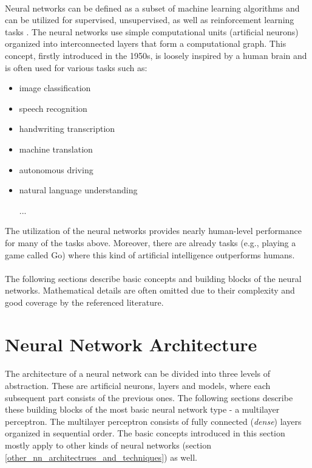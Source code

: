\paragraph{}
Neural networks can be defined as a subset of machine learning algorithms and can be utilized for supervised, unsupervised, as well as reinforcement learning tasks \cite{ml_foundations}. The neural networks use simple computational units (artificial neurons) organized into interconnected layers that form a computational graph. This concept, firstly introduced in the 1950s, is loosely inspired by a human brain \cite{path_mind_NN} and is often used for various tasks \cite{deep_learning_with_python} such as:

\begin{itemize}
	\item image classification
	\item speech recognition
	\item handwriting transcription
	\item machine translation
	\item autonomous driving
	\item natural language understanding
	\item[...]
\end{itemize}

The utilization of the neural networks provides nearly human-level performance for many of the tasks above. Moreover, there are already tasks (e.g., playing a game called Go) where this kind of artificial intelligence outperforms humans.

\paragraph{}
The following sections describe basic concepts and building blocks of the neural networks. Mathematical details are often omitted due to their complexity and good coverage by the referenced literature. 

\section{Neural Network Architecture}
\paragraph{}
The architecture of a neural network can be divided into three levels of abstraction. These are artificial neurons, layers and models, where each subsequent part consists of the previous ones. The following sections describe these building blocks of the most basic neural network type - a multilayer perceptron. The multilayer perceptron consists of fully connected (\textit{dense}) layers organized in sequential order. The basic concepts introduced in this section mostly apply to other kinds of neural networks (section  \ref{other_nn_architectrues_and_techniques}) as well.

